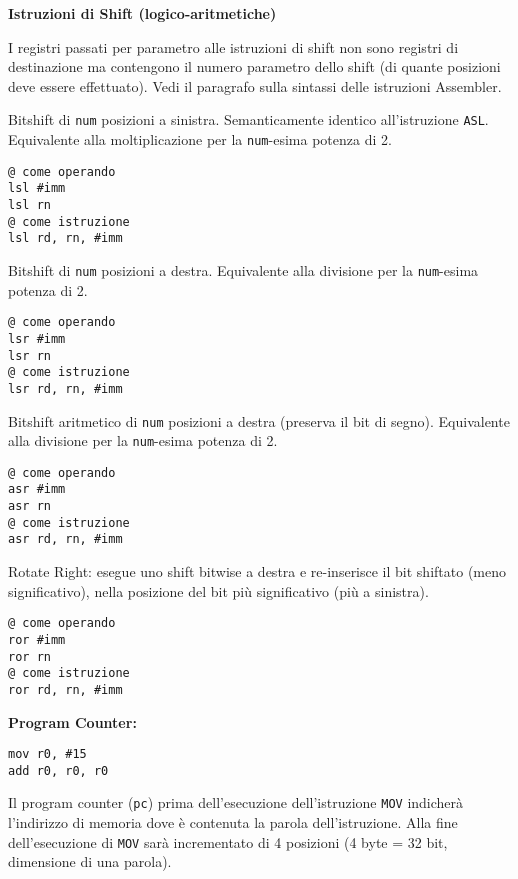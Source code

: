 \begin{defn}
\textbf{Istruzioni di Shift (logico-aritmetiche)}

\begin{note}
	I registri passati per parametro alle istruzioni di shift non sono registri di destinazione ma contengono il numero parametro dello shift (di quante posizioni deve essere effettuato). Vedi il paragrafo sulla sintassi delle istruzioni Assembler.
\end{note}

Bitshift di \verb|num| posizioni a sinistra. Semanticamente identico all'istruzione \verb|ASL|. Equivalente alla moltiplicazione per la \verb|num|-esima potenza di 2.
\begin{lstlisting}[style=arm]
@ come operando
lsl #imm
lsl rn
@ come istruzione
lsl rd, rn, #imm
\end{lstlisting}

Bitshift di \verb|num| posizioni a destra. Equivalente alla divisione per la \verb|num|-esima potenza di 2.
\begin{lstlisting}[style=arm]
@ come operando
lsr #imm
lsr rn
@ come istruzione
lsr rd, rn, #imm
\end{lstlisting}


Bitshift aritmetico di \verb|num| posizioni a destra (preserva il bit di segno). Equivalente alla divisione per la \verb|num|-esima potenza di 2.
\begin{lstlisting}[style=arm]
@ come operando
asr #imm
asr rn
@ come istruzione
asr rd, rn, #imm
\end{lstlisting}



Rotate Right: esegue uno shift bitwise a destra e re-inserisce il bit shiftato (meno significativo), nella posizione del bit più significativo (più a sinistra).
\begin{lstlisting}[style=arm]
@ come operando
ror #imm
ror rn
@ come istruzione
ror rd, rn, #imm
\end{lstlisting}

\end{defn}


\begin{exmp}
\textbf{Program Counter:}


\begin{lstlisting}[style=arm]
mov r0, #15
add r0, r0, r0
\end{lstlisting}


Il program counter (\verb|pc|) prima dell'esecuzione dell'istruzione \verb|MOV| indicherà l'indirizzo di memoria dove è contenuta la parola dell'istruzione. Alla fine dell'esecuzione di \verb|MOV| sarà incrementato di 4 posizioni (4 byte = 32 bit, dimensione di una parola).
\end{exmp}

